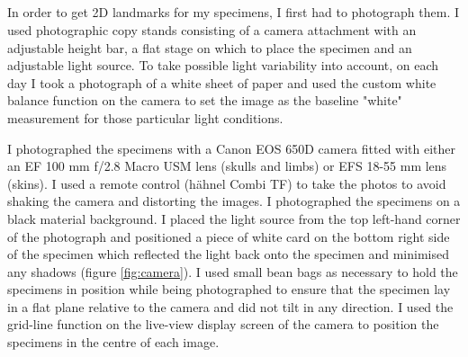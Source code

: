 \subsection{}

	In order to get 2D landmarks for my specimens, I first had to photograph them. I used photographic copy stands consisting of a camera attachment with an adjustable height bar, a flat stage on which to place the specimen and an adjustable light source. To take possible light variability into account, on each day I took a photograph of a white sheet of paper and used the custom white balance function on the camera to set the image as the baseline "white" measurement for those particular light conditions.
	
	I photographed the specimens with a Canon EOS 650D camera fitted with either an EF 100 mm f/2.8 Macro USM lens (skulls and limbs) or EFS 18-55 mm lens (skins). I used a remote control (h\"ahnel Combi TF) to take the photos to avoid shaking the camera and distorting the images. I photographed the specimens on a black material background. I placed the light source from the top left-hand corner of the photograph and positioned a piece of white card on the bottom right side of the specimen which reflected the light back onto the specimen and minimised any shadows (figure \ref{fig:camera}). I used small bean bags as necessary to hold the specimens in position while being photographed to ensure that the specimen lay in a flat plane relative to the camera and did not tilt in any direction. I used the grid-line function on the live-view display screen of the camera to position the specimens in the centre of each image. 

